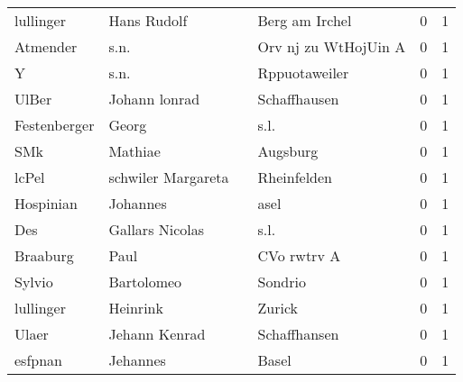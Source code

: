\begin{tabular}{llllrr}
                lullinger &                        Hans Rudolf &             &                              Berg am Irchel &          0 &         1 \\
                 Atmender &                               s.n. &             &                        Orv nj zu WtHojUin A &          0 &         1 \\
                        Y &                               s.n. &             &                               Rppuotaweiler &          0 &         1 \\
                    UlBer &                      Johann lonrad &             &                                Schaffhausen &          0 &         1 \\
             Festenberger &                              Georg &             &                                        s.l. &          0 &         1 \\
                      SMk &                            Mathiae &             &                                    Augsburg &          0 &         1 \\
                    lcPel &                 schwiler Margareta &             &                                 Rheinfelden &          0 &         1 \\
                Hospinian &                           Johannes &             &                                        asel &          0 &         1 \\
                      Des &                    Gallars Nicolas &             &                                        s.l. &          0 &         1 \\
                 Braaburg &                               Paul &             &                                 CVo rwtrv A &          0 &         1 \\
                   Sylvio &                         Bartolomeo &             &                                     Sondrio &          0 &         1 \\
                lullinger &                           Heinrink &             &                                      Zurick &          0 &         1 \\
                    Ulaer &                      Jehann Kenrad &             &                                Schaffhansen &          0 &         1 \\
                  esfpnan &                           Jehannes &             &                                       Basel &          0 &         1 \\

\end{tabular}
